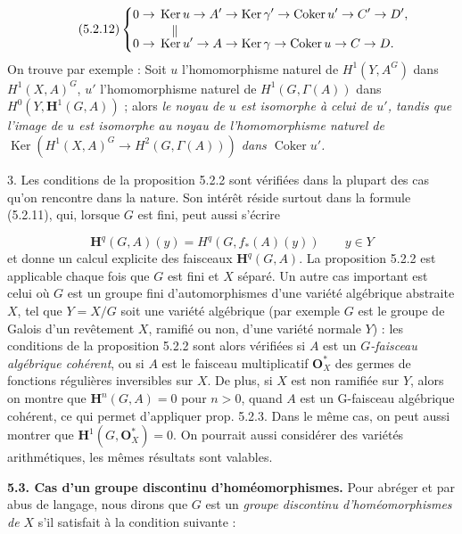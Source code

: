 \[
\tag{5.2.12}
\left\{
\begin{aligned}
0\to{}&\operatorname{Ker}u\to A'
\to\operatorname{Ker}\gamma'
\to\operatorname{Coker}u'\to C'\to D',\\[-0.2em]
&\hphantom{\operatorname{K}}\mathrel{\Vert}\\[-0.45em]
0\to{}&\operatorname{Ker}u'\to A
\to\operatorname{Ker}\gamma
\to\operatorname{Coker}u\to C\to D.
\end{aligned}
\right.
\]
On trouve par exemple : Soit $u$ l'homomorphisme naturel de $H^1(Y,A^G)$ dans
$H^1(X,A)^G$, $u'$ l'homomorphisme naturel de $H^1(G,\Gamma(A))$ dans
$H^0(Y,\mathbf H^1(G,A))$ ; alors \textit{le noyau de $u$ est isomorphe à
celui de $u'$, tandis que l'image de $u$ est isomorphe au noyau de
l'homomorphisme naturel de
$\operatorname{Ker}(H^1(X,A)^G\to H^2(G,\Gamma(A)))$ dans
$\operatorname{Coker}u'$.}

3. Les conditions de la proposition 5.2.2 sont vérifiées dans la
plupart des cas qu'on rencontre dans la nature. Son intérêt réside surtout
dans la formule (5.2.11), qui, lorsque $G$ est fini, peut aussi s'écrire

\[
\mathbf H^q(G,A)(y)=H^q(G,f_*(A)(y))\qquad y\in Y
\tag{5.2.11 bis}
\]
et donne un calcul explicite des faisceaux $\mathbf H^q(G,A)$. La proposition
5.2.2 est applicable chaque fois que $G$ est fini et $X$ séparé. Un autre cas
important est celui où $G$ est un groupe fini d'automorphismes d'une variété
algébrique abstraite $X$, tel que $Y=X/G$ soit une variété algébrique (par
exemple $G$ est le groupe de Galois d'un revêtement $X$, ramifié ou non, d'une
variété normale $Y$) : les conditions de la proposition 5.2.2 sont alors
vérifiées si $A$ est un \textit{$G$-faisceau algébrique cohérent}, ou si $A$
est le faisceau multiplicatif $\mathbf O_X^*$ des germes de fonctions
régulières inversibles sur $X$. De plus, si $X$ est non ramifiée sur $Y$,
alors on montre que $\mathbf H^n(G,A)=0$ pour $n>0$, quand $A$ est un
G-faisceau algébrique cohérent, ce qui permet d'appliquer prop. 5.2.3. Dans
le même cas, on peut aussi montrer que $\mathbf H^1(G,\mathbf O_X^*)=0$. On
pourrait aussi considérer des variétés arithmétiques, les mêmes résultats sont
valables.

\bigskip
\textbf{5.3. Cas d'un groupe discontinu d'homéomorphismes.} Pour
abréger et par abus de langage, nous dirons que $G$ est un \textit{groupe
discontinu d'homéomorphismes de $X$} s'il satisfait à la condition suivante :

